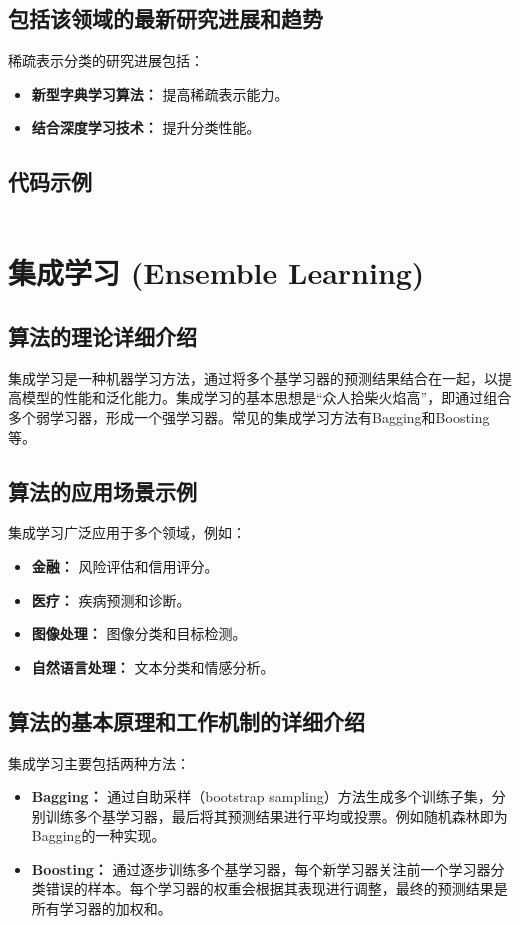 \subsection*{包括该领域的最新研究进展和趋势}
稀疏表示分类的研究进展包括：
\begin{itemize}
    \item \textbf{新型字典学习算法：} 提高稀疏表示能力。
    \item \textbf{结合深度学习技术：} 提升分类性能。
\end{itemize}
\subsection*{代码示例}
\begin{lstlisting}

\end{lstlisting}


\section{集成学习 (Ensemble Learning)}
\subsection*{算法的理论详细介绍}
集成学习是一种机器学习方法，通过将多个基学习器的预测结果结合在一起，以提高模型的性能和泛化能力。集成学习的基本思想是“众人拾柴火焰高”，即通过组合多个弱学习器，形成一个强学习器。常见的集成学习方法有Bagging和Boosting等。

\subsection*{算法的应用场景示例}
集成学习广泛应用于多个领域，例如：
\begin{itemize}
    \item \textbf{金融：} 风险评估和信用评分。
    \item \textbf{医疗：} 疾病预测和诊断。
    \item \textbf{图像处理：} 图像分类和目标检测。
    \item \textbf{自然语言处理：} 文本分类和情感分析。
\end{itemize}

\subsection*{算法的基本原理和工作机制的详细介绍}
集成学习主要包括两种方法：
\begin{itemize}
    \item \textbf{Bagging：} 通过自助采样（bootstrap sampling）方法生成多个训练子集，分别训练多个基学习器，最后将其预测结果进行平均或投票。例如随机森林即为Bagging的一种实现。
    \item \textbf{Boosting：} 通过逐步训练多个基学习器，每个新学习器关注前一个学习器分类错误的样本。每个学习器的权重会根据其表现进行调整，最终的预测结果是所有学习器的加权和。
\end{itemize}

